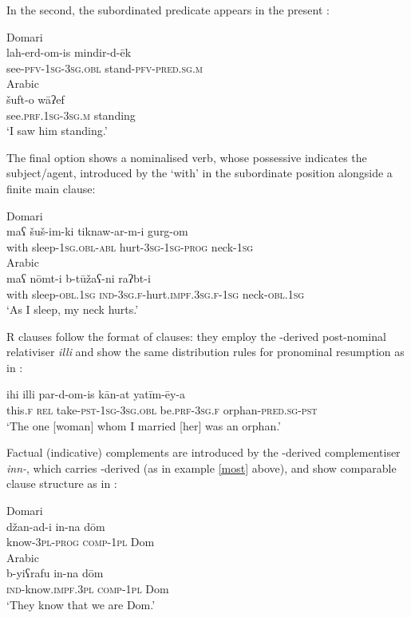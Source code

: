 \documentclass[output=paper]{langsci/langscibook}
\begin{document}
In the second, the subordinated predicate appears in the present :

\ea
\ea
{Domari}\\
\gll lah-erd-om-is mindir-d-ēk    \\
       see-\textsc{pfv-1sg-3sg.obl} stand-\textsc{pfv-pred.sg.m}\\
 
\ex
{Arabic}\\
\gll šuft-o   wāʔef    \\
     see.\textsc{prf.1sg-3sg.m} standing\\
\glt ‘I saw him standing.’
\z
\z

The final option shows a nominalised verb, whose possessive  indicates the subject/agent, introduced by the  ‘with’ in the subordinate position alongside a finite main clause:

\ea
\ea
{Domari}\\
\gll maʕ šuš-im-ki tiknaw-ar-m-i gurg-om  \\
       with sleep-\textsc{1sg.obl-abl} hurt-\textsc{3sg-1sg-prog} neck-1\textsc{sg}\\

\ex
{Arabic}\\
\gll maʕ nōmt-i b-tūžaʕ-ni raʔbt-i  \\
       with sleep-\textsc{obl.1sg} \textsc{ind-3sg.f}-hurt.\textsc{impf.3sg.f-1sg} neck-\textsc{obl.1sg}\\
\glt       ‘As I sleep, my neck hurts.’
\z
\z

R clauses follow the format of   clauses: they employ the -derived post-nominal relativiser \textit{illi} and show the same distribution rules for pronominal resumption as in :

\ea \gll   ihi illi par-d-om-is kān-at yatīm-ēy-a\\
       this.\textsc{f} \textsc{rel} take-\textsc{pst-1sg-3sg.obl} be.\textsc{prf-3sg.f} orphan-\textsc{pred.sg-pst}\\
\glt   ‘The one [woman] whom I married [her] was an orphan.’
\z

Factual (indicative) complements are introduced by the -derived complementiser \textit{inn-}, which carries -derived  (as in example \ref{most} above), and show comparable clause structure as in :

\ea
\ea
{Domari}\\
\gll džan-ad-i in-na dōm    \\
     know-\textsc{3pl-prog} \textsc{comp}-\textsc{1pl} Dom\\
\ex
{Arabic}\\
\gll b-yiʕrafu in-na dōm  \\
     \textsc{ind}-know.\textsc{impf.3pl} \textsc{comp}-\textsc{1pl} Dom\\
\glt ‘They know that we are Dom.’
\z
\z
\end{document}
